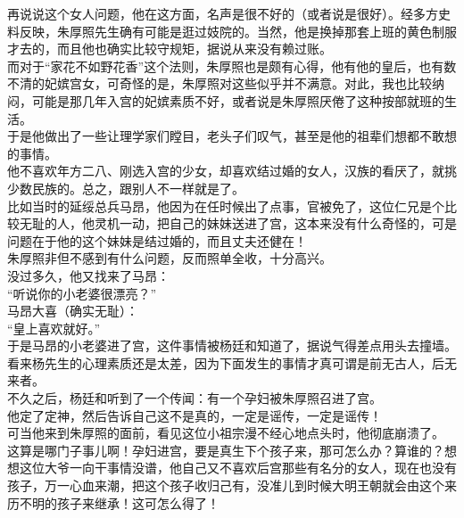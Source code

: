 \begin{multicols}{\theparacolNo}
再说说这个女人问题，他在这方面，名声是很不好的（或者说是很好）。经多方史料反映，朱厚照先生确有可能是逛过妓院的。当然，他是换掉那套上班的黄色制服才去的，而且他也确实比较守规矩，据说从来没有赖过账。\\

而对于“家花不如野花香”这个法则，朱厚照也是颇有心得，他有他的皇后，也有数不清的妃嫔宫女，可奇怪的是，朱厚照对这些似乎并不满意。对此，我也比较纳闷，可能是那几年入宫的妃嫔素质不好，或者说是朱厚照厌倦了这种按部就班的生活。\\

于是他做出了一些让理学家们瞠目，老头子们叹气，甚至是他的祖辈们想都不敢想的事情。\\

他不喜欢年方二八、刚选入宫的少女，却喜欢结过婚的女人，汉族的看厌了，就挑少数民族的。总之，跟别人不一样就是了。\\

比如当时的延绥总兵马昂，他因为在任时候出了点事，官被免了，这位仁兄是个比较无耻的人，他灵机一动，把自己的妹妹送进了宫，这本来没有什么奇怪的，可是问题在于他的这个妹妹是结过婚的，而且丈夫还健在！\\

朱厚照非但不感到有什么问题，反而照单全收，十分高兴。\\

没过多久，他又找来了马昂：\\

“听说你的小老婆很漂亮？”\\

马昂大喜（确实无耻）：\\

“皇上喜欢就好。”\\

于是马昂的小老婆进了宫，这件事情被杨廷和知道了，据说气得差点用头去撞墙。\\

看来杨先生的心理素质还是太差，因为下面发生的事情才真可谓是前无古人，后无来者。\\

不久之后，杨廷和听到了一个传闻：有一个孕妇被朱厚照召进了宫。\\

他定了定神，然后告诉自己这不是真的，一定是谣传，一定是谣传！\\

可当他来到朱厚照的面前，看见这位小祖宗漫不经心地点头时，他彻底崩溃了。\\

这算是哪门子事儿啊！孕妇进宫，要是真生下个孩子来，那可怎么办？算谁的？想想这位大爷一向干事情没谱，他自己又不喜欢后宫那些有名分的女人，现在也没有孩子，万一心血来潮，把这个孩子收归己有，没准儿到时候大明王朝就会由这个来历不明的孩子来继承！这可怎么得了！\\


\end{multicols}

